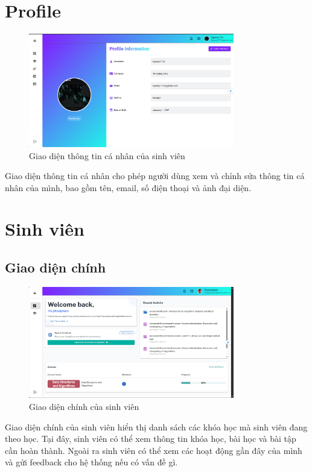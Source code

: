 \section{Profile}
\begin{figure}[H]
    \centering
    \includegraphics[width=0.8\textwidth]{images/CapScreen_Student/Profile.png}
    \caption{Giao diện thông tin cá nhân của sinh viên}
    \label{fig:profile_page}
\end{figure}
Giao diện thông tin cá nhân cho phép người dùng xem và chỉnh sửa thông tin cá nhân của mình, bao gồm tên, email, số điện thoại và ảnh đại diện.
\section{Sinh viên}
\subsection{Giao diện chính}
\begin{figure}[H]
    \centering
    \includegraphics[width=0.8\textwidth]{images/CapScreen_Student/Dashboard.png}
    \caption{Giao diện chính của sinh viên}
    \label{fig:home_page}
\end{figure}
Giao diện chính của sinh viên hiển thị danh sách các khóa học mà sinh viên đang theo học. Tại đây, sinh viên có thể xem thông tin khóa học, bài học và bài tập cần hoàn thành. Ngoài ra sinh viên có thể xem các hoạt động gần đây của mình và gửi feedback cho hệ thống nếu có vấn đề gì.
